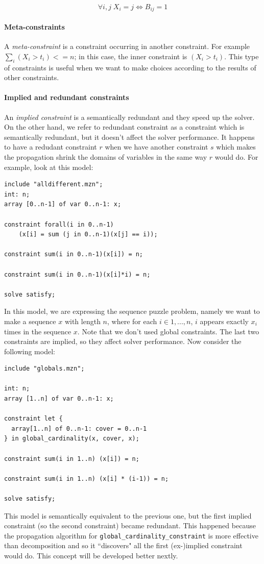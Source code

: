 \documentclass[10pt,a4paper]{article}
\begin{document}
\[ \forall i, j \; X_i = j \iff B_{ij} = 1 \]

\paragraph{Meta-constraints}
A \textit{meta-constraint} is a constraint occurring in another constraint. For
example $ \sum_{i} (X_i > t_i) <= n $; in this case, the inner constraint is
$ (X_i > t_i) $. This type of constraints is useful when we want to make choices
according to the results of other constraints.

\paragraph{Implied and redundant constraints}
An \textit{implied constraint} is a semantically redundant and they speed up the
solver. On the other hand, we refer to redundant constraint as a constraint
which is semantically redundant, but it doesn't affect the solver performance.
It happens to have a redudant constraint $r$ when we have another constraint $s$
which makes the propagation shrink the domains of variables in the same way $r$
would do. For example, look at this model:

\begin{lstlisting}[style=none]
include "alldifferent.mzn";
int: n;
array [0..n-1] of var 0..n-1: x;

constraint forall(i in 0..n-1)
    (x[i] = sum (j in 0..n-1)(x[j] == i));

constraint sum(i in 0..n-1)(x[i]) = n;

constraint sum(i in 0..n-1)(x[i]*i) = n;

solve satisfy;
\end{lstlisting}

In this model, we are expressing the sequence puzzle problem, namely we want to
make a sequence $x$ with length $n$, where for each $i \in {1, ..., n}$, $i$
appears exactly $x_i$ times in the sequence $x$. Note that we don't used global
constraints. The last two constraints are implied, so they affect solver
performance. Now consider the following model:

\begin{lstlisting}[style=none]
include "globals.mzn";

int: n;
array [1..n] of var 0..n-1: x;

constraint let {
  array[1..n] of 0..n-1: cover = 0..n-1
} in global_cardinality(x, cover, x);

constraint sum(i in 1..n) (x[i]) = n;

constraint sum(i in 1..n) (x[i] * (i-1)) = n;

solve satisfy;
\end{lstlisting}
This model is semantically equivalent to the previous one, but the first implied
constraint (so the second constraint) became redundant. This happened because
the propagation algorithm for \texttt{global\_cardinality\_constraint} is more
effective than decomposition and so it ``discovers" all the first (ex-)implied
constraint would do. This concept will be developed better nextly.
\end{document}
